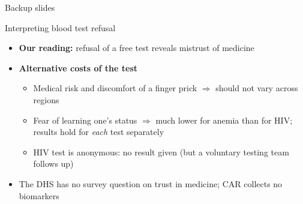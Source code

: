 \documentclass[aspectratio=1610]{beamer}
\newcommand{\returnbutton}[1]{\par\vfill\hfill\hyperlink{#1}{\beamerreturnbutton{Back}}}
\begin{document}
\appendix
\backupslidestrue

\begin{frame}[plain]
  \centering
  \vfill
  {\Huge Backup slides}
  \vfill
\end{frame}

\begin{frame}[label=bk-interpretation]{Interpreting blood test refusal}
  \begin{itemize}
    \item \textbf{Our reading:} refusal of a free test reveals mistrust of medicine
    \item \textbf{Alternative costs of the test}
      \begin{itemize}
        \item Medical risk and discomfort of a finger prick $\Rightarrow$ should not vary across regions
        \item Fear of learning one's status $\Rightarrow$ much lower for anemia than for HIV;
          results hold for \emph{each} test separately
        \item HIV test is anonymous: no result given (but a voluntary testing team follows up)
      \end{itemize}
    \item The DHS has no survey question on trust in medicine; CAR collects no biomarkers
  \end{itemize}
  \returnbutton{main-outcomes}
\end{frame}
\end{document}
